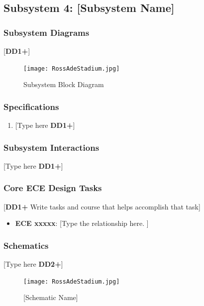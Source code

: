 \documentclass[letterpaper, 11pt]{article}
\begin{document}
\clearpage
\subsection{Subsystem 4: [Subsystem Name]}

\subsubsection{Subsystem Diagrams}
[\textbf{DD1+}]
\begin{figure}[h]
    \centering
    \texttt{[image: RossAdeStadium.jpg]} %
    \caption{Subsystem Block Diagram}
\end{figure} %

\subsubsection{Specifications}
\begin{enumerate}
    \item {[Type here \textbf{DD1+}]}
\end{enumerate}

\subsubsection{Subsystem Interactions}
[Type here \textbf{DD1+}]

\subsubsection{Core ECE Design Tasks}
[\textbf{DD1+} Write tasks and course that helps accomplish that task]
\begin{itemize}
    \item \textbf{ECE xxxxx}: [Type the relationship here. ]
\end{itemize}

\subsubsection{Schematics}
[Type here \textbf{DD2+}]
\begin{figure}[h]
    \centering
    \texttt{[image: RossAdeStadium.jpg]} %
    \caption{[Schematic Name]}
\end{figure} %
\end{document}
